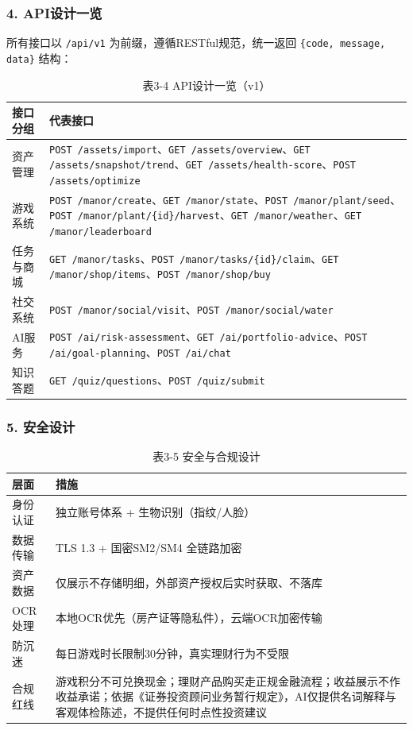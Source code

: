 \documentclass[12pt,a4paper]{ctexart}
\newcommand{\sub}[1]{\subsubsection*{#1}}
\begin{document}
\sub{4. API设计一览}
所有接口以 \texttt{/api/v1} 为前缀，遵循RESTful规范，统一返回 \texttt{\{code, message, data\}} 结构：
\begin{table}[htbp]
\centering
\begin{tabular}{p{4.5cm}p{8cm}}
\toprule
\textbf{接口分组} & \textbf{代表接口} \\
\midrule
资产管理 & \texttt{POST /assets/import}、\texttt{GET /assets/overview}、\texttt{GET /assets/snapshot/trend}、\texttt{GET /assets/health-score}、\texttt{POST /assets/optimize} \\
游戏系统 & \texttt{POST /manor/create}、\texttt{GET /manor/state}、\texttt{POST /manor/plant/seed}、\texttt{POST /manor/plant/\{id\}/harvest}、\texttt{GET /manor/weather}、\texttt{GET /manor/leaderboard} \\
任务与商城 & \texttt{GET /manor/tasks}、\texttt{POST /manor/tasks/\{id\}/claim}、\texttt{GET /manor/shop/items}、\texttt{POST /manor/shop/buy} \\
社交系统 & \texttt{POST /manor/social/visit}、\texttt{POST /manor/social/water} \\
AI服务 & \texttt{POST /ai/risk-assessment}、\texttt{GET /ai/portfolio-advice}、\texttt{POST /ai/goal-planning}、\texttt{POST /ai/chat} \\
知识答题 & \texttt{GET /quiz/questions}、\texttt{POST /quiz/submit} \\
\bottomrule
\end{tabular}
\caption*{表3-4 \quad API设计一览（v1）}
\end{table}

\sub{5. 安全设计}
\begin{table}[htbp]
\centering
\begin{tabular}{p{3cm}p{9.5cm}}
\toprule
\textbf{层面} & \textbf{措施} \\
\midrule
身份认证 & 独立账号体系 + 生物识别（指纹/人脸） \\
数据传输 & TLS 1.3 + 国密SM2/SM4 全链路加密 \\
资产数据 & 仅展示不存储明细，外部资产授权后实时获取、不落库 \\
OCR处理 & 本地OCR优先（房产证等隐私件），云端OCR加密传输 \\
防沉迷 & 每日游戏时长限制30分钟，真实理财行为不受限 \\
合规红线 & 游戏积分不可兑换现金；理财产品购买走正规金融流程；收益展示不作收益承诺；依据《证券投资顾问业务暂行规定》，AI仅提供名词解释与客观体检陈述，不提供任何时点性投资建议 \\
\bottomrule
\end{tabular}
\caption*{表3-5 \quad 安全与合规设计}
\end{table}
\end{document}
